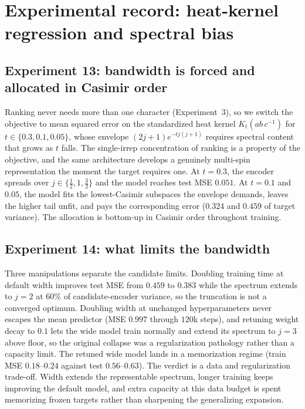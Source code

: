 \documentclass{article}
\begin{document}
\section{Experimental record: heat-kernel regression and spectral bias}
\label{app:spectral-exps}

\subsection{Experiment 13: bandwidth is forced and allocated in
Casimir order}

Ranking never needs more than one character (Experiment~3), so we
switch the objective to mean squared error on the standardized heat
kernel $K_t(ab\,c^{-1})$ for $t \in \{0.3, 0.1, 0.05\}$, whose
envelope $(2j+1)e^{-t j(j+1)}$ requires spectral content that grows
as $t$ falls. The single-irrep concentration of ranking is a
property of the objective, and the same architecture develops a
genuinely multi-spin representation the moment the target requires
one. At $t = 0.3$, the encoder spreads over
$j \in \{\tfrac12, 1, \tfrac32\}$ and the model reaches test MSE
$0.051$. At $t = 0.1$ and $0.05$, the model fits the lowest-Casimir
subspaces the envelope demands, leaves the higher tail unfit, and
pays the corresponding error ($0.324$ and $0.459$ of target
variance). The allocation is bottom-up in Casimir order throughout
training.

\subsection{Experiment 14: what limits the bandwidth}

Three manipulations separate the candidate limits. Doubling training
time at default width improves test MSE from $0.459$ to $0.383$
while the spectrum extends to $j = 2$ at $60\%$ of candidate-encoder
variance, so the truncation is not a converged optimum. Doubling
width at unchanged hyperparameters never escapes the mean predictor
(MSE $0.997$ through $120$k steps), and retuning weight decay to
$0.1$ lets the wide model train normally and extend its spectrum to
$j = 3$ above floor, so the original collapse was a regularization
pathology rather than a capacity limit. The retuned wide model
lands in a memorization regime (train MSE $0.18$--$0.24$ against
test $0.56$--$0.63$). The verdict is a data and regularization
trade-off. Width extends the representable spectrum, longer
training keeps improving the default model, and extra capacity at
this data budget is spent memorizing frozen targets rather than
sharpening the generalizing expansion.
\end{document}
